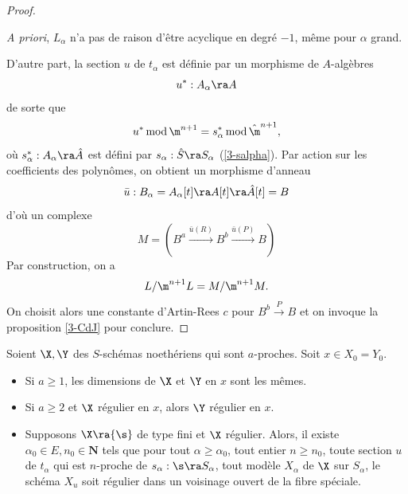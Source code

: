 \documentclass[10pt]{../fichiers-configuration-latex/smfart}
\begin{document}
\begin{proof}
\begin{remarque}\textit{A priori}, $L_\alpha$ n'a pas de
raison d'être acyclique en degré $-1$, même pour $\alpha$
grand. \end{remarque}


D'autre part, la section $u$ de $t_\alpha$ est définie par un
morphisme de $A$-algèbres $$u^*:A_\alpha\ra A$$ de sorte que
$$u^*\mod\m^{n+1}=s^*_\alpha\mod\hat\m^{n+1},$$
 où $s_\alpha^*: A_\alpha\ra\hat A$ est défini par $s_\alpha:\hat
 S\ra S_\alpha$ (\ref{3-salpha}). Par action sur les coefficients
 des polynômes, on obtient un morphisme d'anneau
$$\bar u:B_\alpha=A_\alpha[t]\ra A[t]\ra\hat A[t]=B$$ d'où un
complexe \begin{equation*}
  M=(  B^a\xrightarrow{\bar u(R)}B^b\xrightarrow{\bar u(P)}B)
\end{equation*}  Par construction, on a $$L/\m^{n+1}L=M/\m^{n+1}M.$$
On choisit alors une constante d'Artin-Rees $c$ pour
$B^{b}\xrightarrow{P}B$ et on invoque la proposition \ref{3-CdJ}
pour conclure.  \end{proof}



\begin{corollaire}\label{3-perm}Soient $\X,{{\Y}}$ des
$S$-schémas noethériens qui sont $a$-proches. Soit $x\in X_0=Y_0$.
\begin{itemize} \item[(i)] Si $a\geq 1$, les dimensions de $\X$ et
${{\Y}}$ en $x$ sont les mêmes.  \item[(ii)] Si $a\geq 2$ et $\X$
régulier en $x$, alors ${{\Y}}$ régulier en $x$.  \item[(iii)]
Supposons $\X\ra{\s}$ de type fini et $\X$ régulier. Alors,
il existe $\alpha_0\in E, n_0\in\mathbf{N}$ tels que  pour tout
$\alpha\geq\alpha_0$, tout entier $n\geq n_0$, toute section $u$
de $t_\alpha$ qui est $n$-proche de $s_\alpha:{\s}\ra S_\alpha$,
tout modèle $X_\alpha$ de $\X$ sur $S_\alpha$, le schéma $X_u$
soit régulier dans un voisinage ouvert de la fibre spéciale.
\end{itemize} \end{corollaire}
\end{document}
